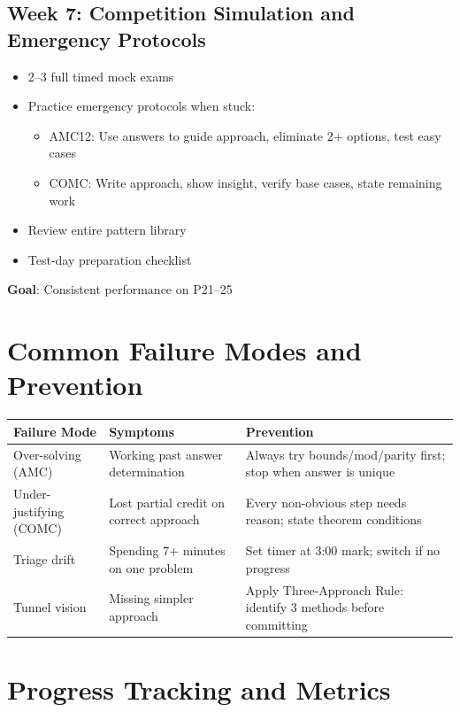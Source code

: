 \documentclass[]{article}
\begin{document}
\subsection{Week 7: Competition Simulation and Emergency Protocols}
\begin{itemize}[leftmargin=*]
    \item 2--3 full timed mock exams
    \item Practice emergency protocols when stuck:
    \begin{itemize}
        \item AMC12: Use answers to guide approach, eliminate 2+ options, test easy cases
        \item COMC: Write approach, show insight, verify base cases, state remaining work
    \end{itemize}
    \item Review entire pattern library
    \item Test-day preparation checklist
\end{itemize}
\textbf{Goal}: Consistent performance on P21--25

\section{Common Failure Modes and Prevention}

\begin{table}[ht]
\centering
\begin{tabular}{@{}p{3.5cm}p{4.5cm}p{5cm}@{}}
\toprule
\textbf{Failure Mode} & \textbf{Symptoms} & \textbf{Prevention} \\
\midrule
Over-solving (AMC) & Working past answer determination & Always try bounds/mod/parity first; stop when answer is unique \\
Under-justifying (COMC) & Lost partial credit on correct approach & Every non-obvious step needs reason; state theorem conditions \\
Triage drift & Spending 7+ minutes on one problem & Set timer at 3:00 mark; switch if no progress \\
Tunnel vision & Missing simpler approach & Apply Three-Approach Rule: identify 3 methods before committing \\
\bottomrule
\end{tabular}
\end{table}

\section{Progress Tracking and Metrics}
\end{document}
